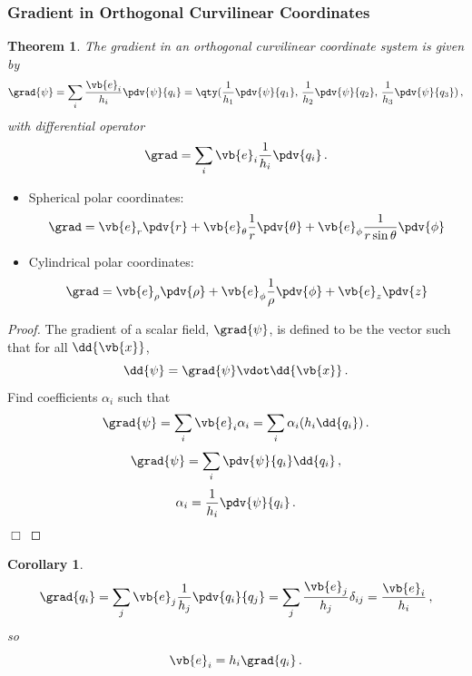 \documentclass{article}
\theoremstyle{plain}\theoremheaderfont{\normalfont\itshape}\theorembodyfont{\rmfamily}\theoremseparator{.}\newtheorem*{rem}{Remark}\newtheorem*{ex}{Example}\newtheorem*{proof}{Proof}\newtheorem*{altp}{Alternative proof}
\theoremstyle{plain}\theoremheaderfont{\normalfont\bfseries}\theorembodyfont{\rmfamily}\theoremseparator{.}\newtheorem{thm}{Theorem}[section]\newtheorem{lem}[thm]{Lemma}\newtheorem{prop}[thm]{Proposition}\newtheorem*{cor}{Corollary}\newtheorem{defn}[thm]{Definition}\newtheorem{clm}[thm]{Claim}\newtheorem{clminproof}{Claim}
\theoremstyle{break}\theoremheaderfont{\normalfont\itshape}\theorembodyfont{\rmfamily}\theoremseparator{.\medskip}\newtheorem*{proofskip}{Proof}\newtheorem*{exs}{Examples}\newtheorem*{rems}{Remarks}
\theoremstyle{break}\theoremheaderfont{\normalfont\bfseries}\theorembodyfont{\rmfamily}\theoremseparator{.\medskip}\newtheorem{lemskip}[thm]{Lemma}\newtheorem{defnskip}[thm]{Definition}\newtheorem{propskip}[thm]{Proposition}\newtheorem{thmskip}[thm]{Theorem}
\numberwithin{equation}{section}
\newcommand{\qed}{\hfill\ensuremath{\Box}}
\begin{document}
	\subsubsection{Gradient in Orthogonal Curvilinear Coordinates}
	\begin{thm}
		The gradient in an orthogonal curvilinear coordinate system is given by
		\[\grad{\psi}=\sum_{i}\frac{\vb{e}_i}{h_i}\pdv{\psi}{q_i}=\qty(\frac{1}{h_1}\pdv{\psi}{q_1},\, \frac{1}{h_2}\pdv{\psi}{q_2},\, \frac{1}{h_3}\pdv{\psi}{q_3})\,,\]
		with differential operator
		\[\grad=\sum_{i}\vb{e}_i\frac{1}{h_i}\pdv{q_i}\,.\]
	\end{thm}
	\begin{itemize}[leftmargin=50pt]
		\item Spherical polar coordinates:
		\[\grad=\vb{e}_r\pdv{r}+\vb{e}_\theta\frac{1}{r}\pdv{\theta}+\vb{e}_\phi\frac{1}{r\sin\theta}\pdv{\phi}\]
		\item Cylindrical polar coordinates:
		\[\grad=\vb{e}_\rho\pdv{\rho}+\vb{e}_\phi\frac{1}{\rho}\pdv{\phi}+\vb{e}_z\pdv{z}\]
	\end{itemize}
	\begin{proof}
		The gradient of a scalar field, \(\grad{\psi}\), is defined to be the vector such that for all \(\dd{\vb{x}}\),
		\[\dd{\psi}=\grad{\psi}\vdot\dd{\vb{x}}\,.\]
		Find coefficients \(\alpha_i\) such that
		\[\grad{\psi}=\sum_{i}\vb{e}_i\alpha_i=\sum_{i}\alpha_i(h_i\dd{q_i})\,.\]
		\[\grad{\psi}=\sum_{i}\pdv{\psi}{q_i}\dd{q_i}\,,\]
		\[\alpha_i=\frac{1}{h_i}\pdv{\psi}{q_i}\,.\]\qed
	\end{proof}
	\begin{cor}
		\[\grad{q_i}=\sum_{j}\vb{e}_j\frac{1}{h_j}\pdv{q_i}{q_j}=\sum_{j}\frac{\vb{e}_j}{h_j}\delta_{ij}=\frac{\vb{e}_i}{h_i}\,,\]
		so
		\[\vb{e}_i=h_i\grad{q_i}\,.\]
	\end{cor}
\end{document}
